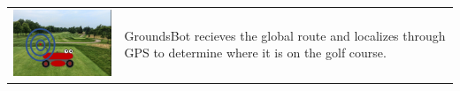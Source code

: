 \documentclass[12pt]{extarticle}
\begin{document}
\begin{table}[H]
\begin{tabularx}{\textwidth}{cX}
\\
\includegraphics[width=6cm, valign=t]{usecase1_4.png} &
GroundsBot recieves the global route and localizes through GPS to determine where it is on the golf course.
\\
\end{tabularx}
\end{table}

\begin{table}[H]
   \def\arraystretch{4}
   \setlength\tabcolsep{8pt}



\end{table}
\end{document}

